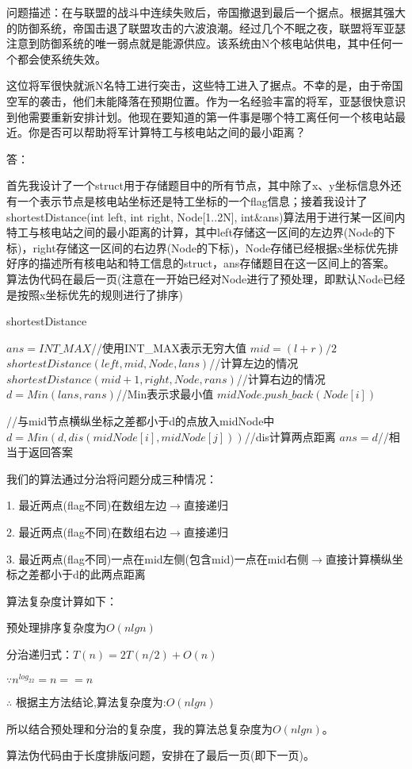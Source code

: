 \documentclass[UTF8]{ctexart}
\begin{document}
问题描述：在与联盟的战斗中连续失败后，帝国撤退到最后一个据点。根据其强大的防御系统，帝国击退了联盟攻击的六波浪潮。经过几个不眠之夜，联盟将军亚瑟注意到防御系统的唯一弱点就是能源供应。该系统由N个核电站供电，其中任何一个都会使系统失效。

这位将军很快就派N名特工进行突击，这些特工进入了据点。不幸的是，由于帝国空军的袭击，他们未能降落在预期位置。作为一名经验丰富的将军，亚瑟很快意识到他需要重新安排计划。他现在要知道的第一件事是哪个特工离任何一个核电站最近。你是否可以帮助将军计算特工与核电站之间的最小距离？

\noindent 答：

首先我设计了一个struct用于存储题目中的所有节点，其中除了x、y坐标信息外还有一个表示节点是核电站坐标还是特工坐标的一个flag信息；接着我设计了shortestDistance(int left, int right, Node[1..2N], int\&ans)算法用于进行某一区间内特工与核电站之间的最小距离的计算，其中left存储这一区间的左边界(Node的下标)，right存储这一区间的右边界(Node的下标)，Node存储已经根据x坐标优先排好序的描述所有核电站和特工信息的struct，ans存储题目在这一区间上的答案。算法伪代码在最后一页(注意在一开始已经对Node进行了预处理，即默认Node已经是按照x坐标优先的规则进行了排序)

\begin{algorithm}[h]
  \caption{shortestDistance}
  \begin{algorithmic}[1]
  \STATE $ans = INT\_MAX$//使用INT\_MAX表示无穷大值
  \ELSE
  \STATE $mid = (l + r) / 2$
  \STATE $shortestDistance(left, mid, Node, lans)$//计算左边的情况
  \STATE $shortestDistance(mid + 1, right, Node, rans)$//计算右边的情况
  \STATE $d = Min(lans, rans)$//Min表示求最小值
      \STATE $midNode.push\_back(Node[i])$

	  //与mid节点横纵坐标之差都小于d的点放入midNode中
	  \ENDIF
	\ENDIF
  \ENDFOR
	  \STATE $d = Min(d, dis(midNode[i], midNode[j]))$//dis计算两点距离
	  \ENDIF
	\ENDFOR
  \ENDFOR
  \STATE $ans = d$//相当于返回答案
  \ENDIF
  \end{algorithmic}
\end{algorithm}

我们的算法通过分治将问题分成三种情况：

1. 最近两点(flag不同)在数组左边$\rightarrow$直接递归

2. 最近两点(flag不同)在数组右边$\rightarrow$直接递归

3. 最近两点(flag不同)一点在mid左侧(包含mid)一点在mid右侧$\rightarrow$直接计算横纵坐标之差都小于d的此两点距离

算法复杂度计算如下：

预处理排序复杂度为$O(nlgn)$

分治递归式：$T(n) = 2T(n/2) + O(n)$

$\because n^{log_22} = n == n$

$\therefore$ 根据主方法结论,算法复杂度为:$O(nlgn)$

所以结合预处理和分治的复杂度，我的算法总复杂度为$O(nlgn)$。

算法伪代码由于长度排版问题，安排在了最后一页(即下一页)。
\end{document}
